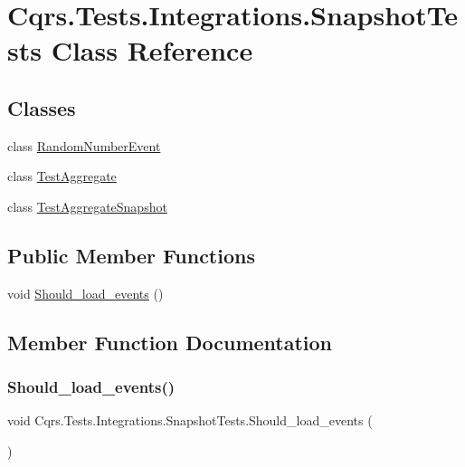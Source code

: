 \hypertarget{classCqrs_1_1Tests_1_1Integrations_1_1SnapshotTests}{}\section{Cqrs.\+Tests.\+Integrations.\+Snapshot\+Tests Class Reference}
\label{classCqrs_1_1Tests_1_1Integrations_1_1SnapshotTests}
\subsection*{Classes}
\begin{DoxyCompactItemize}
\item 
class \hyperlink{classCqrs_1_1Tests_1_1Integrations_1_1SnapshotTests_1_1RandomNumberEvent}{Random\+Number\+Event}
\item 
class \hyperlink{classCqrs_1_1Tests_1_1Integrations_1_1SnapshotTests_1_1TestAggregate}{Test\+Aggregate}
\item 
class \hyperlink{classCqrs_1_1Tests_1_1Integrations_1_1SnapshotTests_1_1TestAggregateSnapshot}{Test\+Aggregate\+Snapshot}
\end{DoxyCompactItemize}
\subsection*{Public Member Functions}
\begin{DoxyCompactItemize}
\item 
void \hyperlink{classCqrs_1_1Tests_1_1Integrations_1_1SnapshotTests_a363a8cde831181f5a495c8df94d1b633_a363a8cde831181f5a495c8df94d1b633}{Should\+\_\+load\+\_\+events} ()
\end{DoxyCompactItemize}


\subsection{Member Function Documentation}
\mbox{\label{classCqrs_1_1Tests_1_1Integrations_1_1SnapshotTests_a363a8cde831181f5a495c8df94d1b633_a363a8cde831181f5a495c8df94d1b633}} 
\subsubsection{\texorpdfstring{Should\+\_\+load\+\_\+events()}{Should\_load\_events()}}
{\footnotesize\ttfamily void Cqrs.\+Tests.\+Integrations.\+Snapshot\+Tests.\+Should\+\_\+load\+\_\+events (\begin{DoxyParamCaption}{ }\end{DoxyParamCaption})}

